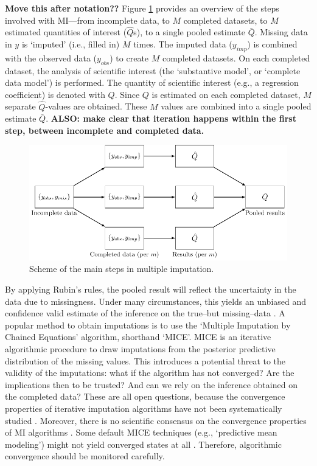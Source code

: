 \documentclass[Royal,times,sageh]{sagej}
\begin{document}
\textbf{Move this after notation??} Figure \ref{fig:diagram} provides an
overview of the steps involved with MI---from incomplete data, to \(M\)
completed datasets, to \(M\) estimated quantities of interest
(\(\hat{Q}\)s), to a single pooled estimate \(\bar{Q}\). Missing data in
\(y\) is `imputed' (i.e., filled in) \(M\) times. The imputed data
(\(y_{imp}\)) is combined with the observed data (\(y_{obs}\)) to create
\(M\) completed datasets. On each completed dataset, the analysis of
scientific interest (the `substantive model', or `complete data model')
is performed. The quantity of scientific interest (e.g., a regression
coefficient) is denoted with \(Q\). Since \(Q\) is estimated on each
completed dataset, \(M\) separate \(\hat{Q}\)-values are obtained. These
\(M\) values are combined into a single pooled estimate \(\bar{Q}\).
\textbf{ALSO: make clear that iteration happens within the first step,
between incomplete and completed data.}

\begin{figure}

{\centering \includegraphics[width=\linewidth]{./images/diagram} 

}

\caption{Scheme of the main steps in multiple imputation.}\label{fig:diagram}
\end{figure}

By applying Rubin's rules, the pooled result will reflect the
uncertainty in the data due to missingness. Under many circumstances,
this yields an unbiased and confidence valid estimate of the inference
on the true--but missing--data \citep{buur18}. A popular method to
obtain imputations is to use the `Multiple Imputation by Chained
Equations' algorithm, shorthand `MICE'\citep{mice}. MICE is an iterative
algorithmic procedure to draw imputations from the posterior predictive
distribution of the missing values. This introduces a potential threat
to the validity of the imputations: what if the algorithm has not
converged? Are the implications then to be trusted? And can we rely on
the inference obtained on the completed data? These are all open
questions, because the convergence properties of iterative imputation
algorithms have not been systematically studied \citep{buur18}.
Moreover, there is no scientific consensus on the convergence properties
of MI algorithms \citep{taka17}. Some default MICE techniques (e.g.,
`predictive mean modeling') might not yield converged states at all
\citep{murr18}. Therefore, algorithmic convergence should be monitored
carefully.
\end{document}
